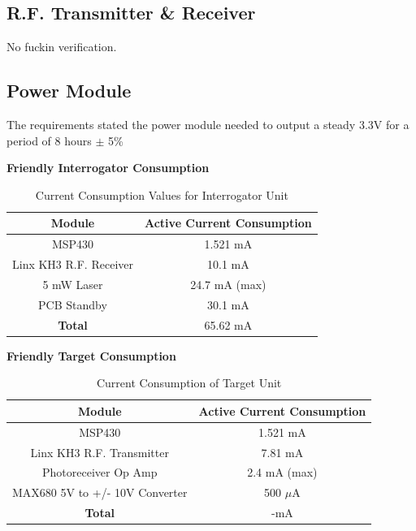 \documentclass[letterpaper,10pt]{article}
\begin{document}
\begin{spacing}{1.15}
\subsection{R.F. Transmitter \& Receiver}
No fuckin verification.

\subsection{Power Module}
The requirements stated the power module needed to output a steady 3.3V for a period of 8 hours $\pm$ 5\%

\hspace{5mm}\textbf{Friendly Interrogator Consumption} \label{section:interrogator-consumption}
\begin{table}[htbp]
	\centering
	\begin{tabular}{c|c}	%
		\toprule	%
		Module & Active Current Consumption \\
		\midrule
		MSP430 & 1.521 mA \\ 
		Linx KH3 R.F. Receiver & 10.1 mA \\
		5 mW Laser & 24.7 mA (max) \\
		PCB Standby & 30.1 mA \\
		\bottomrule	%
		\textbf{Total} & 65.62 mA \\
	\end{tabular}%
	\caption{Current Consumption Values for Interrogator Unit}
	\label{tab:table2}	%
\end{table}%


\hspace{5mm}\textbf{Friendly Target Consumption} \label{section:ttarget-consumption}
\begin{table}[htbp]
	\centering
	\begin{tabular}{c|c}	%
		\toprule	%
		Module & Active Current Consumption \\
		\midrule
		MSP430 & 1.521 mA \\ 
		Linx KH3 R.F. Transmitter & 7.81 mA\\
		Photoreceiver Op Amp & 2.4 mA (max)\\
		MAX680 5V to +/- 10V Converter & 500 $\mu$A \\
		\bottomrule	%
		\textbf{Total} & -mA \\
	\end{tabular}%
	\caption{Current Consumption of Target Unit}
	\label{tab:table2}	%
\end{table}%


\end{spacing}
\end{document}
